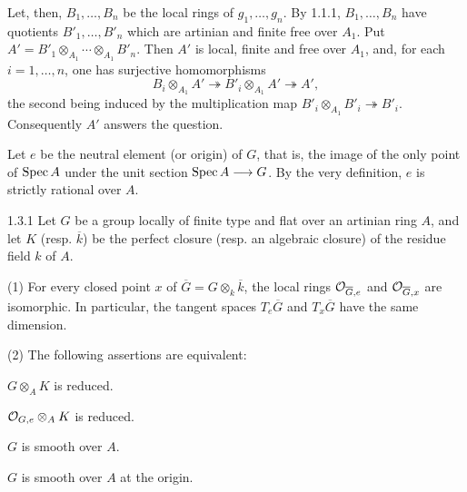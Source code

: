 Let, then, $B_1,\ldots,B_n$ be the local rings of $g_1,\ldots,g_n$. By 1.1.1, $B_1,\ldots,B_n$ have quotients $B'_1,\ldots,B'_n$ which are artinian and finite free over $A_1$. Put $A'=B'_1\otimes_{A_1}\cdots\otimes_{A_1}B'_n$. Then $A'$ is local, finite and free over $A_1$, and, for each $i=1,\ldots,n$, one has surjective homomorphisms
\[
B_i\otimes_{A_1}A'\twoheadrightarrow B'_i\otimes_{A_1}A'\twoheadrightarrow A',
\]
the second being induced by the multiplication map $B'_i\otimes_{A_1}B'_i\twoheadrightarrow B'_i$. Consequently $A'$ answers the question.

Let $e$ be the neutral element (or origin) of $G$, that is, the image of the only point of $\operatorname{Spec} A$ under the unit section $\operatorname{Spec} A\longrightarrow G$. By the very definition, $e$ is strictly rational over $A$.
\begin{proposition}{1.3.1}\label{VIA.1.3.1}
Let $G$ be a group locally of finite type and flat over an artinian ring $A$, and let $K$ (resp. $\overline k$) be the perfect closure (resp. an algebraic closure) of the residue field $k$ of $A$.

(1) For every closed point $x$ of $\overline G=G\otimes_k\overline k$, the local rings $\mathcal{O}_{\overline G,e}$ and $\mathcal{O}_{\overline G,x}$ are isomorphic. In particular, the tangent spaces $T_e\overline G$ and $T_x\overline G$ have the same dimension.

(2) The following assertions are equivalent:
\begin{enumeratei}
\item $G\otimes_AK$ is reduced.
\item[(i bis)] $\mathcal{O}_{G,e}\otimes_AK$ is reduced.
\item $G$ is smooth over $A$.
\item[(ii bis)] $G$ is smooth over $A$ at the origin.
\end{enumeratei}
\end{proposition}
